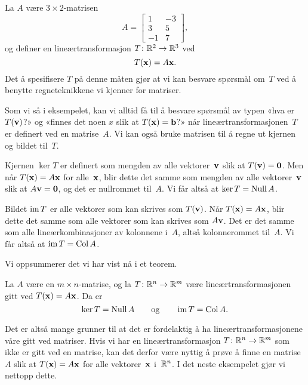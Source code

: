 \begin{ex}
La $A$ være $3 \times 2$-matrisen
\[
A =
\begin{bmatrix}
1 & -3 \\
3 & 5 \\
-1 & 7
\end{bmatrix},
\]
og definer en lineærtransformasjon $T \colon \mathbb{R}^2 \to \mathbb{R}^3$ ved
\[
T(\mathbf{x}) = A \mathbf{x}.
\]
Det å spesifisere $T$ på denne måten gjør at vi kan besvare spørsmål
om~$T$ ved å benytte regneteknikkene vi kjenner for matriser.
\end{ex}

Som vi så i eksempelet, kan vi alltid få til å besvare spørsmål av
typen «hva er $T(\mathbf{v})$?» og «finnes det noen $x$ slik at $T(\mathbf{x}) = \mathbf{b}$?»
når lineærtransformasjonen~$T$ er definert ved en matrise~$A$.  Vi kan
også bruke matrisen til å regne ut kjernen og bildet til~$T$.

Kjernen $\ker T$ er definert som mengden av alle vektorer~$\mathbf{v}$ slik at
$T(\mathbf{v}) = \mathbf{0}$.  Men når $T(\mathbf{x}) = A\mathbf{x}$ for alle~$\mathbf{x}$, blir dette det
samme som mengden av alle vektorer~$\mathbf{v}$ slik at $A\mathbf{v} = \mathbf{0}$, og det er
nullrommet til~$A$.  Vi får altså at $\ker T = \operatorname{Null} A$.

Bildet $\operatorname{im} T$ er alle vektorer som kan skrives som $T(\mathbf{v})$.  Når
$T(\mathbf{x}) = A\mathbf{x}$, blir dette det samme som alle vektorer som kan skrives
som $A\mathbf{v}$.  Det er det samme som alle lineærkombinasjoner av kolonnene
i~$A$, altså kolonnerommet til~$A$.  Vi får altså at $\operatorname{im} T = \operatorname{Col} A$.

Vi oppsummerer det vi har vist nå i et teorem.

\begin{thm}
La $A$ være en $m \times n$-matrise, og la $T \colon \mathbb{R}^n \to \mathbb{R}^m$
være lineærtransformasjonen gitt ved $T(\mathbf{x}) = A\mathbf{x}$.  Da er
\[
\ker T = \operatorname{Null} A
\qquad\text{og}\qquad
\operatorname{im} T = \operatorname{Col} A.
\]
\end{thm}

Det er altså mange grunner til at det er fordelaktig å ha
lineærtransformasjonene våre gitt ved matriser.  Hvis vi har en
lineærtransformasjon $T \colon \mathbb{R}^n \to \mathbb{R}^m$ som ikke er gitt ved en
matrise, kan det derfor være nyttig å prøve å finne en matrise~$A$
slik at $T(\mathbf{x}) = A\mathbf{x}$ for alle vektorer~$\mathbf{x}$ i~$\mathbb{R}^n$.  I det neste
eksempelet gjør vi nettopp dette.

